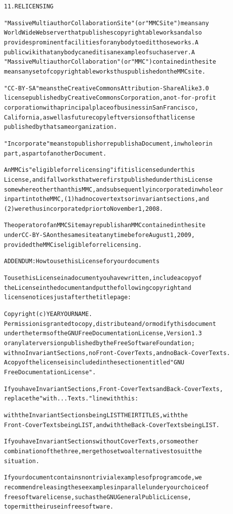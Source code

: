 \documentclass[DIV=12,%
               BCOR=0mm,%
               fontsize=10pt,%
               oneside,%
               paper=210mm:11in]{scrbook}
\begin{document}
\begin{alltt}
11. RELICENSING

"Massive Multiauthor Collaboration Site" (or "MMC Site") means any
World Wide Web server that publishes copyrightable works and also
provides prominent facilities for anybody to edit those works.  A
public wiki that anybody can edit is an example of such a server.  A
"Massive Multiauthor Collaboration" (or "MMC") contained in the site
means any set of copyrightable works thus published on the MMC site.

"CC-BY-SA" means the Creative Commons Attribution-Share Alike 3.0
license published by Creative Commons Corporation, a not-for-profit
corporation with a principal place of business in San Francisco,
California, as well as future copyleft versions of that license
published by that same organization.

"Incorporate" means to publish or republish a Document, in whole or in
part, as part of another Document.

An MMC is "eligible for relicensing" if it is licensed under this
License, and if all works that were first published under this License
somewhere other than this MMC, and subsequently incorporated in whole or
in part into the MMC, (1) had no cover texts or invariant sections, and
(2) were thus incorporated prior to November 1, 2008.

The operator of an MMC Site may republish an MMC contained in the site
under CC-BY-SA on the same site at any time before August 1, 2009,
provided the MMC is eligible for relicensing.


ADDENDUM: How to use this License for your documents

To use this License in a document you have written, include a copy of
the License in the document and put the following copyright and
license notices just after the title page:

    Copyright (c)  YEAR  YOUR NAME.
    Permission is granted to copy, distribute and/or modify this document
    under the terms of the GNU Free Documentation License, Version 1.3
    or any later version published by the Free Software Foundation;
    with no Invariant Sections, no Front-Cover Texts, and no Back-Cover Texts.
    A copy of the license is included in the section entitled "GNU
    Free Documentation License".

If you have Invariant Sections, Front-Cover Texts and Back-Cover Texts,
replace the "with...Texts." line with this:

    with the Invariant Sections being LIST THEIR TITLES, with the
    Front-Cover Texts being LIST, and with the Back-Cover Texts being LIST.

If you have Invariant Sections without Cover Texts, or some other
combination of the three, merge those two alternatives to suit the
situation.

If your document contains nontrivial examples of program code, we
recommend releasing these examples in parallel under your choice of
free software license, such as the GNU General Public License,
to permit their use in free software.


\end{alltt}
\end{document}
